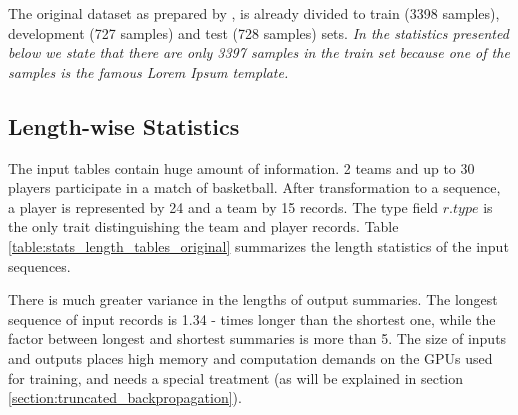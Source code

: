 The original dataset as prepared by \citet{wiseman2017}, is already divided to train (3398 samples), development (727 samples) and test (728 samples) sets. \emph{In the statistics presented below we state that there are only 3397 samples in the train set because one of the samples is the famous Lorem Ipsum template.}

\subsection{Length-wise Statistics}

The input tables contain huge amount of information. 2 teams and up to 30 players participate in a match of basketball. After transformation to a sequence, a player is represented by 24 and a team by 15 records. The type field $r.type$ is the only trait distinguishing the team and player records. Table \ref{table:stats_length_tables_original} summarizes the length statistics of the input sequences. 

\begin{table}[h!]
    \centering
    \caption{Statistics of tables as used by \citet{wiseman2017}} \label{table:stats_length_tables_original}
\end{table}

There is much greater variance in the lengths of output summaries. The longest sequence of input records is 1.34 - times longer than the shortest one, while the factor between longest and shortest summaries is more than 5. The size of inputs and outputs places high memory and computation demands on the GPUs used for training, and needs a special treatment (as will be explained in section \ref{section:truncated_backpropagation}).

